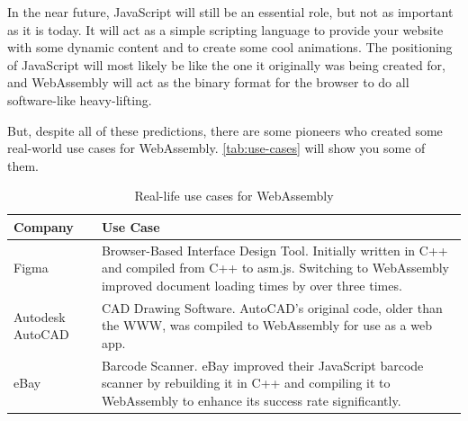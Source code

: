 \documentclass[10pt]{article}  %
\begin{document}
\begin{sloppypar}
  In the near future, JavaScript will still be an essential role, but not as important as it is today. It will act as a simple scripting language to provide your website with some dynamic content and to create some cool animations. The positioning of JavaScript will most likely be like the one it originally was being created for, and WebAssembly will act as the binary format for the browser to do all software-like heavy-lifting.

  But, despite all of these predictions, there are some pioneers who created some real-world use cases for WebAssembly. \autoref{tab:use-cases} will show you some of them.

  \begin{table}[ht]
    \centering
    \renewcommand{\arraystretch}{1.2} %
    \begin{tabularx}{\textwidth}{lX}
      \Xhline{2\arrayrulewidth} %
      \textbf{Company} & \textbf{Use Case}                                                                                                                                                            \\
      \midrule
      Figma            & Browser-Based Interface Design Tool. Initially written in C++ and compiled from C++ to asm.js. Switching to WebAssembly improved document loading times by over three times. \\
      Autodesk AutoCAD & CAD Drawing Software. AutoCAD's original code, older than the WWW, was compiled to WebAssembly for use as a web app.                                                         \\
      eBay             & Barcode Scanner. eBay improved their JavaScript barcode scanner by rebuilding it in C++ and compiling it to WebAssembly to enhance its success rate significantly.           \\
      \bottomrule
    \end{tabularx}
    \caption{Real-life use cases for WebAssembly}
    \label{tab:use-cases}
  \end{table}

  \pagebreak
  
  

\end{sloppypar}
\end{document}
